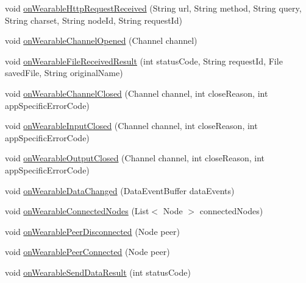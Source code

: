 \begin{DoxyCompactItemize}
\item 
void \hyperlink{classcom_1_1google_1_1devrel_1_1wcl_1_1callbacks_1_1AbstractWearConsumer_a1613a2f3c71e8c42e633c0b62178b935}{on\+Wearable\+Http\+Request\+Received} (String url, String method, String query, String charset, String node\+Id, String request\+Id)
\item 
void \hyperlink{classcom_1_1google_1_1devrel_1_1wcl_1_1callbacks_1_1AbstractWearConsumer_a1c856eec63e10f6626710c5f20e28293}{on\+Wearable\+Channel\+Opened} (Channel channel)
\item 
void \hyperlink{classcom_1_1google_1_1devrel_1_1wcl_1_1callbacks_1_1AbstractWearConsumer_a941f9f616a07c8563cba64818aa7e6f1}{on\+Wearable\+File\+Received\+Result} (int status\+Code, String request\+Id, File saved\+File, String original\+Name)
\item 
void \hyperlink{classcom_1_1google_1_1devrel_1_1wcl_1_1callbacks_1_1AbstractWearConsumer_a9987882f6682f4656059d5dc4609c872}{on\+Wearable\+Channel\+Closed} (Channel channel, int close\+Reason, int app\+Specific\+Error\+Code)
\item 
void \hyperlink{classcom_1_1google_1_1devrel_1_1wcl_1_1callbacks_1_1AbstractWearConsumer_afcb5fe06e5b67e908e4cc75c218f5cfe}{on\+Wearable\+Input\+Closed} (Channel channel, int close\+Reason, int app\+Specific\+Error\+Code)
\item 
void \hyperlink{classcom_1_1google_1_1devrel_1_1wcl_1_1callbacks_1_1AbstractWearConsumer_a3d3c8fe16f5bbdbb2cf46ee68fb31b2a}{on\+Wearable\+Output\+Closed} (Channel channel, int close\+Reason, int app\+Specific\+Error\+Code)
\item 
void \hyperlink{classcom_1_1google_1_1devrel_1_1wcl_1_1callbacks_1_1AbstractWearConsumer_ab2c399f4d68a357d06ebd2bc3adc393d}{on\+Wearable\+Data\+Changed} (Data\+Event\+Buffer data\+Events)
\item 
void \hyperlink{classcom_1_1google_1_1devrel_1_1wcl_1_1callbacks_1_1AbstractWearConsumer_a86518dfa4a09ec45143a6d2b745e410c}{on\+Wearable\+Connected\+Nodes} (List$<$ Node $>$ connected\+Nodes)
\item 
void \hyperlink{classcom_1_1google_1_1devrel_1_1wcl_1_1callbacks_1_1AbstractWearConsumer_a90567f1d8296196b45cc6e9c421a50ac}{on\+Wearable\+Peer\+Disconnected} (Node peer)
\item 
void \hyperlink{classcom_1_1google_1_1devrel_1_1wcl_1_1callbacks_1_1AbstractWearConsumer_a55fba0e1ba11d2eb40d0273971b012f2}{on\+Wearable\+Peer\+Connected} (Node peer)
\item 
void \hyperlink{classcom_1_1google_1_1devrel_1_1wcl_1_1callbacks_1_1AbstractWearConsumer_af1ab8ad33735ff72770ed483062663e1}{on\+Wearable\+Send\+Data\+Result} (int status\+Code)

\end{DoxyCompactItemize}
